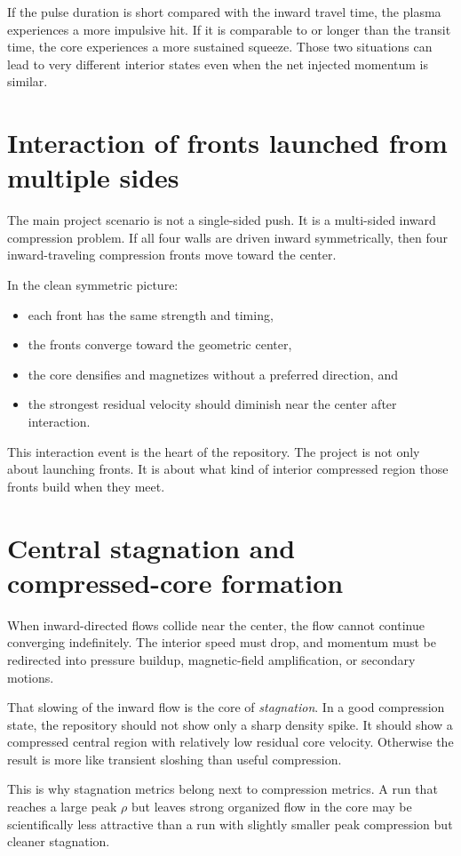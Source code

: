 \documentclass[11pt]{article}
\begin{document}
If the pulse duration is short compared with the inward travel time, the plasma experiences a more impulsive hit. If it is comparable to or longer than the transit time, the core experiences a more sustained squeeze. Those two situations can lead to very different interior states even when the net injected momentum is similar.

\section{Interaction of fronts launched from multiple sides}
The main project scenario is not a single-sided push. It is a multi-sided inward compression problem. If all four walls are driven inward symmetrically, then four inward-traveling compression fronts move toward the center.

In the clean symmetric picture:
\begin{itemize}
    \item each front has the same strength and timing,
    \item the fronts converge toward the geometric center,
    \item the core densifies and magnetizes without a preferred direction, and
    \item the strongest residual velocity should diminish near the center after interaction.
\end{itemize}

This interaction event is the heart of the repository. The project is not only about launching fronts. It is about what kind of interior compressed region those fronts build when they meet.

\section{Central stagnation and compressed-core formation}
When inward-directed flows collide near the center, the flow cannot continue converging indefinitely. The interior speed must drop, and momentum must be redirected into pressure buildup, magnetic-field amplification, or secondary motions.

That slowing of the inward flow is the core of \emph{stagnation}. In a good compression state, the repository should not show only a sharp density spike. It should show a compressed central region with relatively low residual core velocity. Otherwise the result is more like transient sloshing than useful compression.

This is why stagnation metrics belong next to compression metrics. A run that reaches a large peak $\rho$ but leaves strong organized flow in the core may be scientifically less attractive than a run with slightly smaller peak compression but cleaner stagnation.
\end{document}
